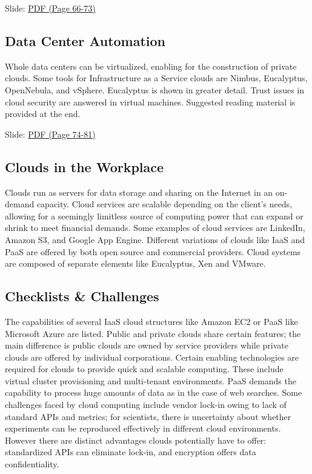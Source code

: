 
  Slide:
  \href{https://drive.google.com/open?id=0B88HKpainTSfQU1uQmxZWHdWQ1k}{PDF
  (Page 66-73)}

\subsection{Data Center Automation}

Whole data centers can be virtualized, enabling for the construction of
private clouds. Some tools for Infrastructure as a Service clouds are
Nimbus, Eucalyptus, OpenNebula, and vSphere. Eucalyptus is shown in
greater detail. Trust issues in cloud security are answered in virtual
machines. Suggested reading material is provided at the end.


  Slide:
  \href{https://drive.google.com/open?id=0B88HKpainTSfQU1uQmxZWHdWQ1k}{PDF
  (Page 74-81)}

\subsection{Clouds in the Workplace}

Clouds run as servers for data storage and sharing on the Internet in an
on-demand capacity. Cloud services are scalable depending on the
client's needs, allowing for a seemingly limitless source of computing
power that can expand or shrink to meet financial demands. Some examples
of cloud services are LinkedIn, Amazon S3, and Google App Engine.
Different variations of clouds like IaaS and PaaS are offered by both
open source and commercial providers. Cloud systems are composed of
separate elements like Eucalyptus, Xen and VMware.


\subsection{Checklists \& Challenges}

The capabilities of several IaaS cloud structures like Amazon EC2 or
PaaS like Microsoft Azure are listed. Public and private clouds share
certain features; the main difference is public clouds are owned by
service providers while private clouds are offered by individual
corporations. Certain enabling technologies are required for clouds to
provide quick and scalable computing. These include virtual cluster
provisioning and multi-tenant environments. PaaS demands the capability
to process huge amounts of data as in the case of web searches. Some
challenges faced by cloud computing include vendor lock-in owing to lack
of standard APIs and metrics; for scientists, there is uncertainty about
whether experiments can be reproduced effectively in different cloud
environments. However there are distinct advantages clouds potentially
have to offer: standardized APIs can eliminate lock-in, and encryption
offers data confidentiality.

